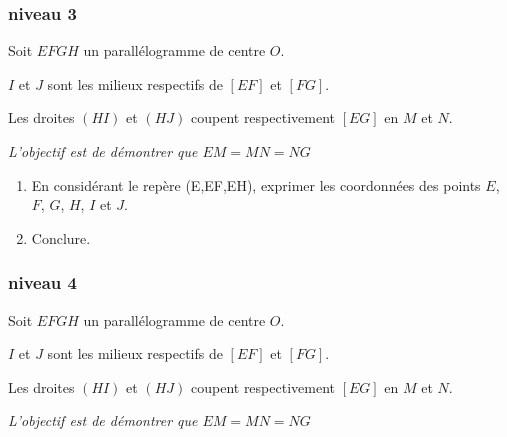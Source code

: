 \subsubsection{niveau 3}

Soit $EFGH$ un parallélogramme de centre $O$.

$I$ et $J$ sont les milieux respectifs de $[EF]$ et $[FG]$.

Les droites $(HI)$ et $(HJ)$ coupent respectivement $[EG]$ en $M$ et $N$.

\textit{L'objectif est de démontrer que $EM=MN=NG$}

\begin{enumerate}
\item En considérant le repère (E,EF,EH), exprimer les coordonnées des points $E$, $F$, $G$, $H$, $I$ et $J$.
\item Conclure.
\end{enumerate}


\subsubsection{niveau 4}

Soit $EFGH$ un parallélogramme de centre $O$.

$I$ et $J$ sont les milieux respectifs de $[EF]$ et $[FG]$.

Les droites $(HI)$ et $(HJ)$ coupent respectivement $[EG]$ en $M$ et $N$.

\textit{L'objectif est de démontrer que $EM=MN=NG$}